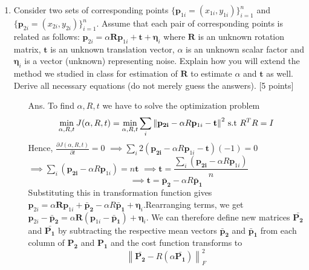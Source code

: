 \documentclass[11pt]{article}
\newcommand{\norm}[1]{\left\lVert#1\right\rVert}
\begin{document}
\begin{enumerate}
\item Consider two sets of corresponding points $\{\mathbf{p}_{1i} = (x_{1i},y_{1i})\}_{i=1}^{n}$ and $\{\mathbf{p}_{2i} = (x_{2i},y_{2i})\}_{i=1}^{n}$. Assume that each pair of corresponding points is related as follows: $\mathbf{p}_{2i} = \alpha \mathbf{R} \mathbf{p}_{1i} + \mathbf{t} + \mathbf{\eta}_i$ where $\mathbf{R}$ is an unknown rotation matrix, $\mathbf{t}$ is an unknown translation vector, $\alpha$ is an unknown scalar factor and $\mathbf{\eta}_i$ is a vector (unknown) representing noise. Explain how you will extend the method we studied in class for estimation of $\mathbf{R}$ to estimate $\alpha$ and $\mathbf{t}$ as well. Derive all necessary equations (do not merely guess the answers). \textsf{[5 points]}
\begin{itemize}
\item[Ans.] To find $\alpha,R,t$ we have to solve the optimization problem 
	\[
		\min_{\alpha,R,t} J(\alpha,R,t)= \min_{\alpha,R,t} \sum_i{\norm{\mathbf{{p}_{2i}} - \alpha R \mathbf{p}_{1i} - \mathbf{t}}}^2
		\textnormal{  s.t  } R^TR = I
	\]
	Hence, $\frac{\partial J(\alpha,R,t)}{\partial t}=0$\newline
	$\implies \sum_i 2(\mathbf{{p}_{2i}} - \alpha R \mathbf{p}_{1i} - \mathbf{t})(-1)=0$\newline
	$\implies \sum_i (\mathbf{{p}_{2i}} - \alpha R \mathbf{p}_{1i})=n\mathbf{t} $ \newline
	$\implies \mathbf{t}=  \dfrac{\sum_i (\mathbf{{p}_{2i}} - \alpha R \mathbf{p}_{1i})}{n} $ \newline
	 \begin{equation}
	\implies\mathbf{t}=  \mathbf{\bar{p}_2}-\alpha R\mathbf{\bar{p}_1}
\end{equation}	  \newline
	Substituting this in transformation function gives
	$\mathbf{p}_{2i} = \alpha \mathbf{R} \mathbf{p}_{1i} + \mathbf{\bar{p}_2}-\alpha R\mathbf{\bar{p}_1} + \mathbf{\eta}_i$.\newline Rearranging terms, we get	
	$\mathbf{p}_{2i} - \mathbf{\bar{p}_2} = \alpha \mathbf{R}( \mathbf{p}_{1i}-\mathbf{\bar{p}_1}) + \mathbf{\eta}_i$.\newline
	We can therefore define new matrices $\mathbf{\bar{P_2} }$ and $\mathbf{\bar{P_1}}$  by subtracting the respective mean vectors $\mathbf{\bar{p}_2}$ and $\mathbf{\bar{p}_1}$ from each column of $\mathbf{P_2} $ and $\mathbf{P_1}$ and the cost function transforms to  \begin{equation}
	\norm{\mathbf{\bar{P_2}} - R (\alpha \mathbf{\bar{P_1}})}_F^2

\end{equation}
\end{itemize}
\end{enumerate}
\end{document}
